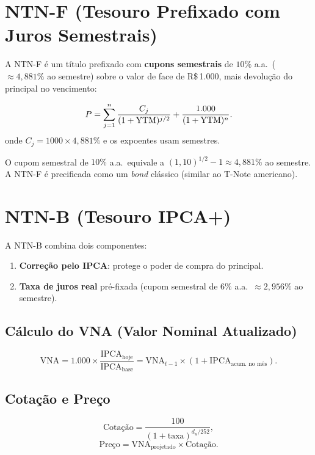 \section{NTN-F (Tesouro Prefixado com Juros Semestrais)}

A NTN-F é um título prefixado com \textbf{cupons semestrais} de $10\%$ a.a.\ ($\approx 4{,}881\%$ ao semestre)
sobre o valor de face de R\$\,1.000, mais devolução do principal no vencimento:

\[
  P = \sum_{j=1}^{n} \frac{C_j}{(1+\mathrm{YTM})^{j/2}}
    + \frac{1{.}000}{(1+\mathrm{YTM})^n}.
\]
onde $C_j = 1000 \times 4{,}881\%$ e os expoentes usam semestres.

\begin{nota}
O cupom semestral de $10\%$ a.a.\ equivale a $(1{,}10)^{1/2}-1 \approx 4{,}881\%$ ao semestre.
A NTN-F é precificada como um \emph{bond} clássico (similar ao T-Note americano).
\end{nota}

\section{NTN-B (Tesouro IPCA+)}

A NTN-B combina dois componentes:
\begin{enumerate}[label=\textbf{\arabic*.}]
  \item \textbf{Correção pelo IPCA}: protege o poder de compra do principal.
  \item \textbf{Taxa de juros real} pré-fixada (cupom semestral de $6\%$ a.a.\ $\approx 2{,}956\%$ ao semestre).
\end{enumerate}

\subsection{Cálculo do VNA (Valor Nominal Atualizado)}

\[
  \text{VNA} = 1{.}000 \times \frac{\text{IPCA}_{\text{hoje}}}{\text{IPCA}_{\text{base}}}
             = \text{VNA}_{t-1} \times (1 + \text{IPCA}_{\text{acum. no mês}}).
\]

\subsection{Cotação e Preço}

\[
  \text{Cotação} = \frac{100}{(1+\text{taxa})^{d_u/252}},
\]
\[
  \text{Preço} = \text{VNA}_{\text{projetado}} \times \text{Cotação}.
\]

